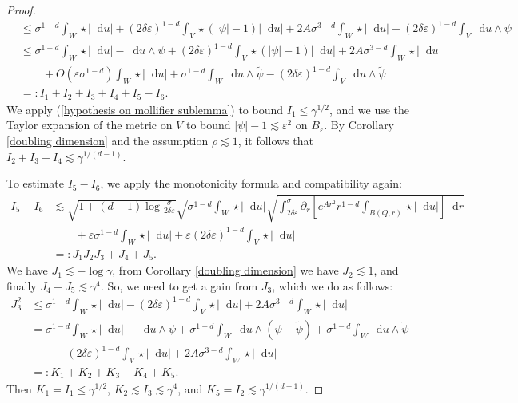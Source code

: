 \documentclass[reqno,11pt]{amsart}
\newcommand*\dif{\mathop{}\!\mathrm{d}}
\theoremstyle{definition}
\numberwithin{equation}{section}
\begin{document}
\begin{proof}
\begin{align*}
&\leq \sigma^{1 - d}\int_W \star |\dif u| + (2\delta\varepsilon)^{1 - d} \int_V \star(|\psi| - 1)|\dif u| + 2A\sigma^{3 - d} \int_W \star |\dif u| - (2\delta\varepsilon)^{1 - d}\int_V \dif u \wedge \psi\\
&\leq \sigma^{1 - d}\int_W \star |\dif u| - \dif u \wedge \psi + (2\delta\varepsilon)^{1 - d} \int_V \star(|\psi| - 1)|\dif u| + 2A\sigma^{3 - d} \int_W \star |\dif u| \\
&\qquad + O(\varepsilon \sigma^{1 - d}) \int_W \star |\dif u| + \sigma^{1 - d}\int_W \dif u \wedge \tilde \psi - (2\delta\varepsilon)^{1 - d}\int_V \dif u \wedge \tilde \psi\\
&=: I_1 + I_2 + I_3 + I_4 + I_5 - I_6.
\end{align*}
We apply (\ref{hypothesis on mollifier sublemma}) to bound $I_1 \leq \gamma^{1/2}$, and we use the Taylor expansion of the metric on $V$ to bound $|\psi| - 1 \lesssim \varepsilon^2$ on $B_\varepsilon$.
By Corollary \ref{doubling dimension} and the assumption $\rho \lesssim 1$, it follows that $I_2 + I_3 + I_4 \lesssim \gamma^{1/(d - 1)}$.

To estimate $I_5 - I_6$, we apply the monotonicity formula and compatibility again:
\begin{align*}
I_5 - I_6 &\lesssim \sqrt{1 + (d - 1) \log \frac{\sigma}{2\delta\varepsilon}} \sqrt{\sigma^{1 - d} \int_W \star |\dif u|} \sqrt{\int_{2\delta\varepsilon}^\sigma \partial_r \left[e^{Ar^2} r^{1 - d} \int_{B(Q, r)} \star |\dif u|\right] \dif r}\\
&\qquad + \varepsilon \sigma^{1 - d} \int_W \star |\dif u| + \varepsilon (2\delta\varepsilon)^{1 - d} \int_V \star |\dif u| \\
&=: J_1 J_2 J_3 + J_4 + J_5.
\end{align*}
We have $J_1 \lesssim -\log \gamma$, from Corollary \ref{doubling dimension} we have $J_2 \lesssim 1$, and finally $J_4 + J_5 \lesssim \gamma^4$.
So, we need to get a gain from $J_3$, which we do as follows:
\begin{align*}
J_3^2 &\leq \sigma^{1 - d} \int_W \star |\dif u| - (2 \delta \varepsilon)^{1 - d} \int_V \star |\dif u| + 2A\sigma^{3 - d} \int_W \star |\dif u| \\
&= \sigma^{1 - d} \int_W \star |\dif u| - \dif u \wedge \psi + \sigma^{1 - d} \int_W \dif u \wedge (\psi - \tilde \psi) + \sigma^{1 - d} \int_W \dif u \wedge \tilde \psi \\
&\qquad - (2 \delta\varepsilon)^{1 - d} \int_V \star |\dif u| + 2A \sigma^{3 - d} \int_W \star |\dif u| \\
&=: K_1 + K_2 + K_3 - K_4 + K_5.
\end{align*}
Then $K_1 = I_1 \leq \gamma^{1/2}$, $K_2 \lesssim I_3 \lesssim \gamma^4$, and $K_5 = I_2 \lesssim \gamma^{1/(d - 1)}$.


\end{proof}
\end{document}
